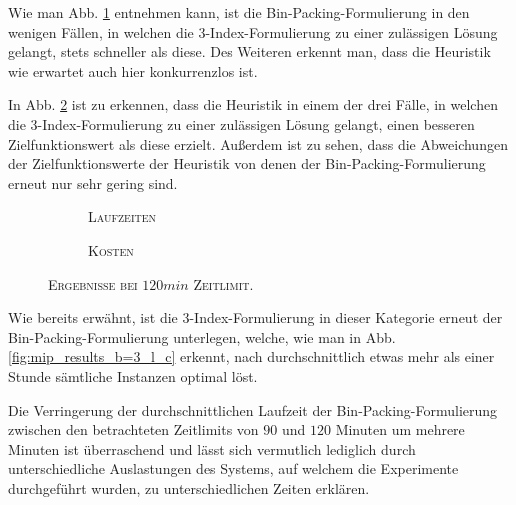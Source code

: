 Wie man Abb. \ref{fig:b=3_l_runtimes} entnehmen kann, ist die Bin-Packing-Formulierung in den wenigen
Fällen, in welchen die 3-Index-Formulierung zu einer zulässigen Lösung gelangt, stets schneller
als diese. Des Weiteren erkennt man, dass die Heuristik wie erwartet auch hier konkurrenzlos ist.

In Abb. \ref{fig:b=3_l_costs} ist zu erkennen, dass die Heuristik in einem der drei Fälle, in welchen die
3-Index-Formulierung zu einer zulässigen Lösung gelangt, einen besseren Zielfunktionswert als diese erzielt.
Außerdem ist zu sehen, dass die Abweichungen der Zielfunktionswerte der Heuristik von denen der Bin-Packing-Formulierung
erneut nur sehr gering sind.

\begin{figure}[H]
\centering
\begin{subfigure}[b]{0.4\textwidth}
\centering
\caption{\textsc{Laufzeiten}}
\label{fig:b=3_l_runtimes}
\end{subfigure}
\hfill
\begin{subfigure}[b]{0.4\textwidth}
\centering
\caption{\textsc{Kosten}}
\label{fig:b=3_l_costs}
\end{subfigure}
\caption{\textsc{Ergebnisse bei $120min$ Zeitlimit}.}
\label{fig:res_plots_b=3_l}
\end{figure}

Wie bereits erwähnt, ist die 3-Index-Formulierung in dieser Kategorie erneut der Bin-Packing-Formulierung
unterlegen, welche, wie man in Abb. \ref{fig:mip_results_b=3_l_c} erkennt, nach durchschnittlich
etwas mehr als einer Stunde sämtliche Instanzen optimal löst.

Die Verringerung der durchschnittlichen Laufzeit der Bin-Packing-Formulierung zwischen den betrachteten
Zeitlimits von $90$ und $120$ Minuten um mehrere Minuten ist überraschend und lässt sich vermutlich
lediglich durch unterschiedliche Auslastungen des Systems, auf welchem die Experimente durchgeführt wurden,
zu unterschiedlichen Zeiten erklären.

